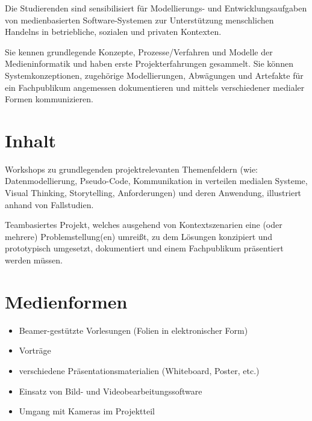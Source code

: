 Die Studierenden sind sensibilisiert für Modellierungs- und
Entwicklungsaufgaben von medienbasierten Software-Systemen zur
Unterstützung menschlichen Handelns in betriebliche, sozialen und
privaten Kontexten.

Sie kennen grundlegende Konzepte, Prozesse/Verfahren und Modelle der
Medieninformatik und haben erste Projekterfahrungen gesammelt. Sie
können Systemkonzeptionen, zugehörige Modellierungen, Abwägungen und
Artefakte für ein Fachpublikum angemessen dokumentieren und mittels
verschiedener medialer Formen kommunizieren.

\hypertarget{inhaltpathlabel....srcmodulbeschreibungen-bachelor-bpo5ba_medienprojekt}{%
\section*{Inhalt\label{../../src/modulbeschreibungen-bachelor-bpo5/BA_Medienprojekt}}\label{inhaltpathlabel....srcmodulbeschreibungen-bachelor-bpo5ba_medienprojekt}}

Workshops zu grundlegenden projektrelevanten Themenfeldern (wie:
Datenmodellierung, Pseudo-Code, Kommunikation in verteilen medialen
Systeme, Visual Thinking, Storytelling, Anforderungen) und deren
Anwendung, illustriert anhand von Fallstudien.

Teambasiertes Projekt, welches ausgehend von Kontextszenarien eine (oder
mehrere) Problemstellung(en) umreißt, zu dem Lösungen konzipiert und
prototypisch umgesetzt, dokumentiert und einem Fachpublikum präsentiert
werden müssen.

\hypertarget{medienformenpathlabel....srcmodulbeschreibungen-bachelor-bpo5ba_medienprojekt}{%
\section*{Medienformen\label{../../src/modulbeschreibungen-bachelor-bpo5/BA_Medienprojekt}}\label{medienformenpathlabel....srcmodulbeschreibungen-bachelor-bpo5ba_medienprojekt}}

\begin{itemize}
\tightlist
\item
  Beamer-gestützte Vorlesungen (Folien in elektronischer Form)
\item
  Vorträge
\item
  verschiedene Präsentationsmaterialien (Whiteboard, Poster, etc.)
\item
  Einsatz von Bild- und Videobearbeitungssoftware
\item
  Umgang mit Kameras im Projektteil
\end{itemize}


